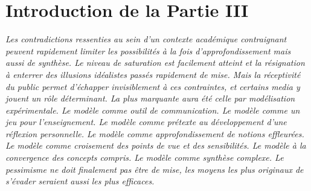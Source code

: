 



\chapter*{Introduction de la Partie III}






\textit{Les contradictions ressenties au sein d'un contexte académique contraignant peuvent rapidement limiter les possibilités à la fois d'approfondissement mais aussi de synthèse. Le niveau de saturation est facilement atteint et la résignation à enterrer des illusions idéalistes passés rapidement de mise. Mais la réceptivité du public permet d'échapper invisiblement à ces contraintes, et certains media y jouent un rôle déterminant. La plus marquante aura été celle par modélisation expérimentale. Le modèle comme outil de communication. Le modèle comme un jeu pour l'enseignement. Le modèle comme prétexte au développement d'une réflexion personnelle. Le modèle comme approfondissement de notions effleurées. Le modèle comme croisement des points de vue et des sensibilités. Le modèle à la convergence des concepts compris. Le modèle comme synthèse complexe. Le pessimisme ne doit finalement pas être de mise, les moyens les plus originaux de s'évader seraient aussi les plus efficaces.}




\bigskip


